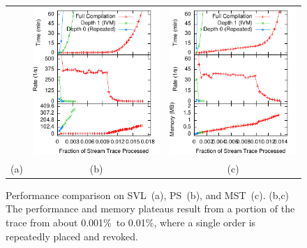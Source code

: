 \begin{figure}
\begin{center}
\begin{minipage}{\textwidth}
\begin{center}
\begin{tabular}{ccc}&
\includegraphics[width=\figurewidth]{../graphs/graphs/unified_pricespread.pdf}&
\includegraphics[width=\figurewidth]{../graphs/graphs/unified_missedtrades.pdf}\\
(a) & (b) & (c)
\end{tabular}
\caption{Performance comparison on SVL~(a), PS~(b), and MST~(c).  (b,c) The performance and memory plateaus result from a portion of the trace from about 0.001\%\ to 0.01\%, where a single order is repeatedly placed and revoked.}
\label{fig:experiments:serverload}
\label{fig:experiments:pricespread}
\label{fig:experiments:MST}
\end{center}
\end{minipage}


\end{center}
\end{figure}
